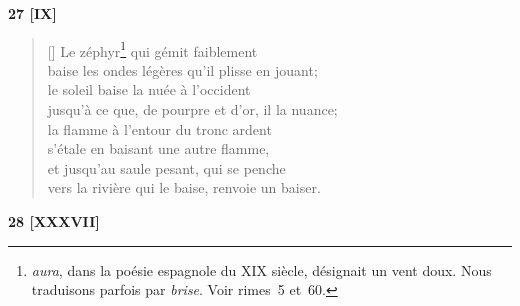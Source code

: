 \documentclass[a4paper,12pt]{book}
\begin{document}
\bigskip

\begin{center}
  \textbf{27 [IX]}
\end{center}

\settowidth{\versewidth}{jusqu'à ce que de pourpre et d'or il la nuance;}

\begin{verse}[\versewidth]
  Le zéphyr\footnote{\emph{aura}, dans la poésie espagnole du XIX\ieme{}
  siècle, désignait un vent doux. Nous traduisons parfois par
  \emph{brise}. Voir rimes~5 et~60.} qui gémit faiblement \\
  baise les ondes légères qu'il plisse en jouant; \\
  le soleil baise la nuée à l'occident \\
  jusqu'à ce que, de pourpre et d'or, il la nuance; \\
  la flamme à l'entour du tronc ardent \\
  s'étale en baisant une autre flamme, \\
  et jusqu'au saule pesant, qui se penche \\
  vers la rivière qui le baise, renvoie un baiser.
\end{verse}

\bigskip

\begin{center}
  \textbf{28 [XXXVII]}
\end{center}

\settowidth{\versewidth}{je porte le fer avec lequel ta main ouvrit}
\end{document}
